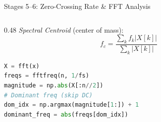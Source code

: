 \documentclass[aspectratio=169,10pt]{beamer}
\begin{document}
\begin{frame}{Stages 5--6: Zero-Crossing Rate \& FFT Analysis}
\begin{columns}[T]
\begin{column}{0.48\textwidth}
\textit{Spectral Centroid} (center of mass):
\begin{equation*}
f_c = \frac{\sum_{k} f_k |X[k]|}{\sum_{k} |X[k]|}
\end{equation*}

\begin{lstlisting}[language=Python]
X = fft(x)
freqs = fftfreq(n, 1/fs)
magnitude = np.abs(X[:n//2])
# Dominant freq (skip DC)
dom_idx = np.argmax(magnitude[1:]) + 1
dominant_freq = abs(freqs[dom_idx])
\end{lstlisting}
\end{column}
\end{columns}
\end{frame}

\end{document}
